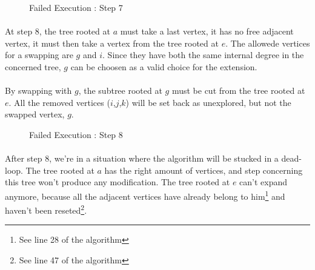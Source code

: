 \begin{figure}[H]
  \caption{Failed Execution : Step 7}
  \begin{center}
    \begin{tikzpicture}[scale=0.9,transform shape]
      
    \end{tikzpicture}
  \end{center}
\end{figure}

\paragraph{}
At step 8, the tree rooted at $a$ must take a last vertex, it has no free
adjacent vertex, it must then take a vertex from the tree rooted at $e$. The
allowede vertices for a swapping are $g$ and $i$. Since they have both the
same internal degree in the concerned tree, $g$ can be choosen as a valid
choice for the extension.

\paragraph{}
By swapping with $g$, the subtree rooted at $g$ must be cut from the tree
rooted at $e$. All the removed vertices ($i$,$j$,$k$) will be set back as
unexplored, but not the swapped vertex, $g$.

\begin{figure}[H]
  \caption{Failed Execution : Step 8}
  \begin{center}
    \begin{tikzpicture}[scale=0.9,transform shape]
      
    \end{tikzpicture}
  \end{center}
\end{figure}

\paragraph{}
After step 8, we're in a situation where the algorithm will be stucked in a
dead-loop. The tree rooted at $a$ has the right amount of vertices, and step
concerning this tree won't produce any modification. The tree rooted at $e$
can't expand anymore, because all the adjacent vertices have already belong to
him\footnote{See line 28 of the algorithm} and haven't been reseted\footnote{
See line 47 of the algorithm}.
